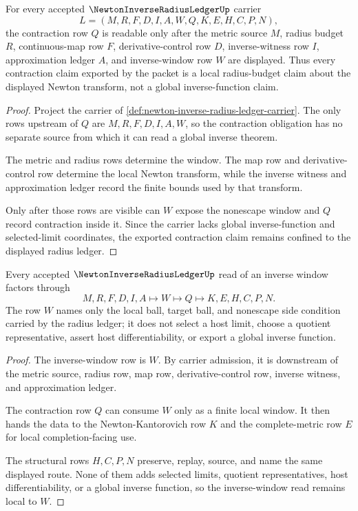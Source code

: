 \begin{theorem}
\label{thm:newton-inverse-radius-ledger-contraction-obligation}
For every accepted $\NewtonInverseRadiusLedgerUp$ carrier
$$
L=(M,R,F,D,I,A,W,Q,K,E,H,C,P,N),
$$
the contraction row $Q$ is readable only after the metric source $M$, radius budget $R$, continuous-map row $F$, derivative-control row $D$, inverse-witness row $I$, approximation ledger $A$, and inverse-window row $W$ are displayed. Thus every contraction claim exported by the packet is a local radius-budget claim about the displayed Newton transform, not a global inverse-function claim.
\end{theorem}
\begin{proof}
Project the carrier of \autoref{def:newton-inverse-radius-ledger-carrier}. The only rows upstream of $Q$ are $M,R,F,D,I,A,W$, so the contraction obligation has no separate source from which it can read a global inverse theorem.

The metric and radius rows determine the window. The map row and derivative-control row determine the local Newton transform, while the inverse witness and approximation ledger record the finite bounds used by that transform.

Only after those rows are visible can $W$ expose the nonescape window and $Q$ record contraction inside it. Since the carrier lacks global inverse-function and selected-limit coordinates, the exported contraction claim remains confined to the displayed radius ledger.
\end{proof}

\begin{theorem}
\label{thm:newton-inverse-radius-ledger-inverse-window-obligation}
Every accepted $\NewtonInverseRadiusLedgerUp$ read of an inverse window factors through
$$
M,R,F,D,I,A \longmapsto W \longmapsto Q \longmapsto K,E,H,C,P,N .
$$
The row $W$ names only the local ball, target ball, and nonescape side condition carried by the radius ledger; it does not select a host limit, choose a quotient representative, assert host differentiability, or export a global inverse function.
\end{theorem}
\begin{proof}
The inverse-window row is $W$. By carrier admission, it is downstream of the metric source, radius row, map row, derivative-control row, inverse witness, and approximation ledger.

The contraction row $Q$ can consume $W$ only as a finite local window. It then hands the data to the Newton-Kantorovich row $K$ and the complete-metric row $E$ for local completion-facing use.

The structural rows $H,C,P,N$ preserve, replay, source, and name the same displayed route. None of them adds selected limits, quotient representatives, host differentiability, or a global inverse function, so the inverse-window read remains local to $W$.
\end{proof}

